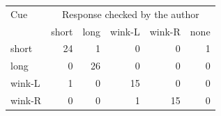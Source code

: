 \begin{tabular}{lrrrrr}
\toprule
Cue & \multicolumn{5}{c}{Response checked by the author} \\
 & short & long & wink-L & wink-R & none \\
\midrule
short & 24 & 1 & 0 & 0 & 1 \\
long & 0 & 26 & 0 & 0 & 0 \\
wink-L & 1 & 0 & 15 & 0 & 0 \\
wink-R & 0 & 0 & 1 & 15 & 0 \\
\bottomrule
\end{tabular}
